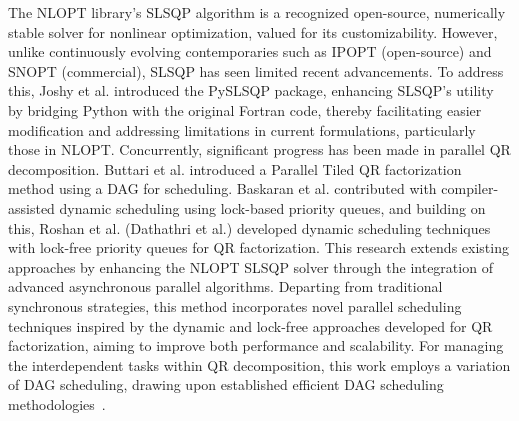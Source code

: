 The NLOPT\cite{NLopt} library's SLSQP\cite{SLSQP} algorithm is a recognized open-source, numerically stable solver for nonlinear optimization, valued for its customizability. However, unlike continuously evolving contemporaries such as IPOPT\cite{biegler2009large} (open-source) and SNOPT\cite{gill2005snopt} (commercial), SLSQP has seen limited recent advancements. To address this, Joshy et al. introduced the PySLSQP\cite{joshy2024pyslsqp} package, enhancing SLSQP's utility by bridging Python with the original Fortran code, thereby facilitating easier modification and addressing limitations in current formulations, particularly those in NLOPT.
Concurrently, significant progress has been made in parallel QR decomposition. Buttari et al.\cite{buttari2008parallel} introduced a Parallel Tiled QR factorization method using a DAG for scheduling. Baskaran et al.\cite{baskaran2009compiler} contributed with compiler-assisted dynamic scheduling using lock-based priority queues, and building on this, Roshan et al. (Dathathri et al.)\cite{dathathri2016compiling} developed dynamic scheduling techniques with lock-free priority queues for QR factorization.
This research extends existing approaches by enhancing the NLOPT SLSQP solver through the integration of advanced asynchronous parallel algorithms. Departing from traditional synchronous strategies, this method incorporates novel parallel scheduling techniques inspired by the dynamic and lock-free approaches developed for QR factorization, aiming to improve both performance and scalability. For managing the interdependent tasks within QR decomposition, this work employs a variation of DAG scheduling, drawing upon established efficient DAG scheduling methodologies~\cite{DAG-scheduling}.